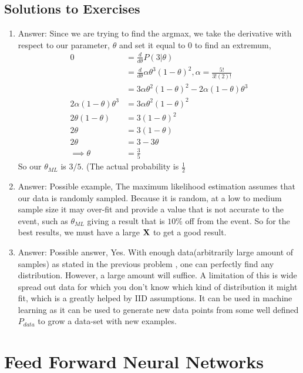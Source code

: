 \section{Solutions to Exercises}
\begin{enumerate}
    \item Answer: Since we are trying to find the argmax, we take the derivative with respect to our parameter, $\theta$ and set it equal to 0 to find an extremum,
    \begin{align*}
        0 & = \frac{d}{d\theta}P(3| \theta)\\
         &= \frac{d}{d\theta}\alpha\theta^3(1-\theta)^2, \alpha = \frac{5!}{3!(2)!}\\
         &=3\alpha \theta^2(1-\theta)^2 - 2\alpha(1-\theta)\theta^3 \\
        2\alpha(1-\theta)\theta^3 & = 3\alpha \theta^2(1-\theta)^2 \\
        2\theta(1-\theta) &= 3(1-\theta)^2 \\
        2\theta &= 3(1-\theta) \\
        2\theta &= 3 - 3\theta \\
        \implies \theta &= \frac{3}{5}
    \end{align*}
    So our $\theta_{ML}$ is $3/5$.  (The actual probability is $\frac{1}{2}$ \\
    \item Answer: Possible example, The maximum likelihood estimation assumes that our data is randomly sampled. Because it is random, at a low to medium sample size it may over-fit and provide a value that is not accurate to the event, such as $\theta_{ML}$ giving a result that is $10\%$ off from the event. So for the best results, we must have a large $\MX$ to get a good result. \\
    \item Answer: Possible answer, Yes. With enough data(arbitrarily large amount of samples) as stated in the previous problem , one can perfectly find any distribution. However, a large amount will suffice. A limitation of this is wide spread out data for which you don't know which kind of distribution it might fit, which is a greatly helped by IID assumptions. It can be used in machine learning as it can be used to generate new data points from some well defined $P_{data}$ to grow a data-set with new examples. 
\end{enumerate}


\chapter{Feed Forward Neural Networks}

